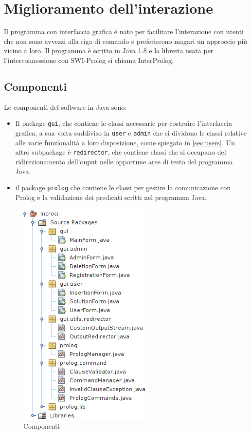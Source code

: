 \section{Miglioramento dell'interazione}
Il programma con interfaccia grafica è nato per facilitare l'interazione con utenti che non sono avvezzi alla riga di comando e preferiscono magari un approccio più vicino a loro. Il programma è scritto in Java 1.8 e la libreria usata per l'interconnessione con SWI-Prolog si chiama InterProlog.

\subsection{Componenti}
Le componenti del software in Java sono:

\begin{itemize}
	\item Il package \texttt{gui}, che contiene le classi necessarie per costruire l'interfaccia grafica, a sua volta suddiviso in \texttt{user} e \texttt{admin} che si dividono le classi relative alle varie funzionalità a loro disposizione, come spiegato in \ref{sec:users}. Un altro subpackage è \texttt{redirector}, che contiene classi che si occupano del ridirezionamento dell'ouput nelle opportune aree di testo del programma Java.
	\item il package \texttt{prolog} che contiene le classi per gestire la comunicazione con Prolog e la validazione dei predicati scritti nel programma Java.
\end{itemize}

\begin{figure}[!htbp]
	\centering
	\includegraphics[width=.4\textwidth]{images/java}
	\caption{Componenti}
\end{figure}

